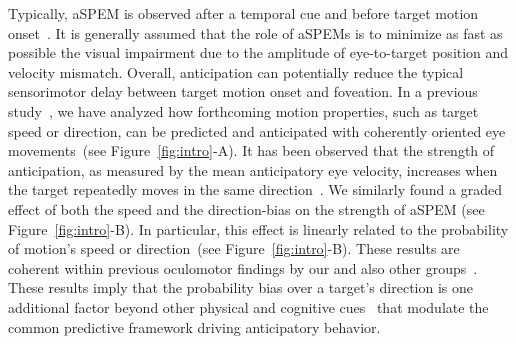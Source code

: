 \documentclass[12pt,english]{article}%
\newcommand{\citep}[1]{\parencite{#1}}
\newcommand{\seeFig}[1]{Figure~\ref{fig:#1}}
\begin{document}
Typically, aSPEM is observed after a temporal cue and
before target motion onset~\citep{Kowler1979a,Kowler1979b, Kowler1984}. %
It is generally assumed that the role of aSPEMs is
to minimize as fast as possible the visual impairment due
to the amplitude of eye-to-target position and velocity mismatch.
Overall, anticipation can potentially reduce the typical sensorimotor delay
between target motion onset and foveation. In a previous study~\citep{Montagnini2010},
we have analyzed how forthcoming motion properties,
such as target speed or direction, can be
predicted and anticipated with coherently oriented eye movements~(see \seeFig{intro}-A).
It has been observed that the strength of anticipation,
as measured by the mean anticipatory eye velocity,
increases when the target repeatedly moves in the same direction~\citep{Kowler1984, Kowler1989, Heinen2005}.
We similarly found a graded effect of both the speed and the direction-bias
on the strength of aSPEM (see \seeFig{intro}-B).
In particular, this effect is linearly related
to the probability of motion's speed or direction~(see \seeFig{intro}-B).
These results are coherent within previous oculomotor findings
by our and also other groups~\citep{SantosKowler2017}.
These results imply that the probability bias over a target's direction is
one additional factor beyond other physical and cognitive cues~\citep{Kowler2014, SantosKowler2017,Damasse18}
that modulate the common predictive framework
driving anticipatory behavior.
%
\end{document}
